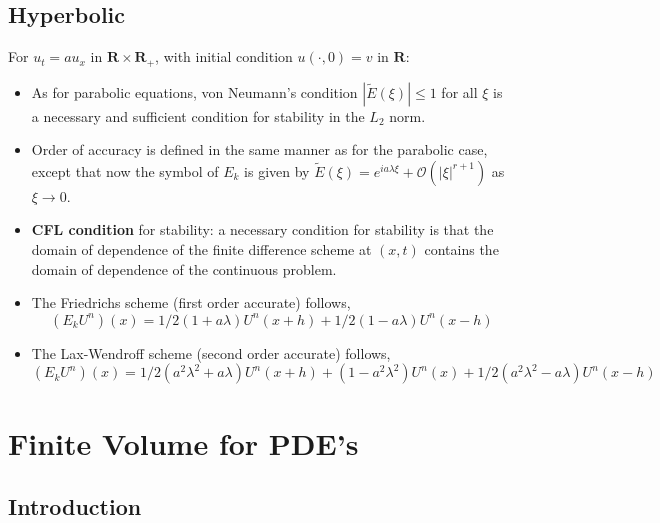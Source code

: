 \documentclass[oneside,a4paper,11pt]{report}
\begin{document}
\chapter{Hyperbolic}
For $u_t = au_x$ in $\mathbf{R}\times\mathbf{R_+}$, with initial condition $u(\cdot,0) = v$ in $\mathbf{R}$:
\begin{itemize}
\item As for parabolic equations, von Neumann's condition $|\tilde{E}(\xi)| \le 1$ for all $\xi$ is a necessary and sufficient condition for stability in the $L_2$ norm. 

\item Order of accuracy is defined in the same manner as for the parabolic case, except that now the symbol of $E_k$ is given by $\tilde{E}(\xi) = e^{ia\lambda\xi} + \mathcal{O}(|\xi|^{r+1})$ as $\xi \to 0$.

\item \textbf{CFL condition} for stability: a necessary condition for stability is that the domain of dependence of the finite difference scheme at $(x,t)$ contains the domain of dependence of the continuous problem.

\item The Friedrichs scheme (first order accurate) follows,
$$(E_kU^n)(x) = 1/2(1+a\lambda)U^n(x+h) + 1/2(1-a\lambda)U^n(x-h)$$

\item The Lax-Wendroff scheme (second order accurate) follows,
$$(E_kU^n)(x) = 1/2(a^2\lambda^2+a\lambda)U^n(x+h) + (1-a^2\lambda^2)U^n(x) + 1/2(a^2\lambda^2-a\lambda)U^n(x-h)$$
\end{itemize}

\part{Finite Volume for PDE's}

\chapter{Introduction}
\end{document}
